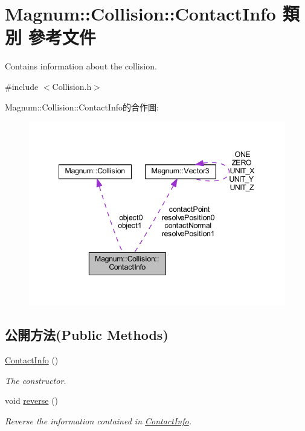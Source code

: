\hypertarget{class_magnum_1_1_collision_1_1_contact_info}{}\section{Magnum\+:\+:Collision\+:\+:Contact\+Info 類別 參考文件}
\label{class_magnum_1_1_collision_1_1_contact_info}


Contains information about the collision.  




{\ttfamily \#include $<$Collision.\+h$>$}



Magnum\+:\+:Collision\+:\+:Contact\+Info的合作圖\+:\nopagebreak
\begin{figure}[H]
\begin{center}
\leavevmode
\includegraphics[width=342pt]{class_magnum_1_1_collision_1_1_contact_info__coll__graph}
\end{center}
\end{figure}
\subsection*{公開方法(Public Methods)}
\begin{DoxyCompactItemize}
\item 
\hyperlink{class_magnum_1_1_collision_1_1_contact_info_ab8342f210574b6abf7ffeb7be87f4d1b}{Contact\+Info} ()\hypertarget{class_magnum_1_1_collision_1_1_contact_info_ab8342f210574b6abf7ffeb7be87f4d1b}{}\label{class_magnum_1_1_collision_1_1_contact_info_ab8342f210574b6abf7ffeb7be87f4d1b}

\begin{DoxyCompactList}\small\item\em The constructor. \end{DoxyCompactList}\item 
void \hyperlink{class_magnum_1_1_collision_1_1_contact_info_a87a3e37fd31e63563ffba3b2e6f88296}{reverse} ()
\begin{DoxyCompactList}\small\item\em Reverse the information contained in \hyperlink{class_magnum_1_1_collision_1_1_contact_info}{Contact\+Info}. \end{DoxyCompactList}\end{DoxyCompactItemize}
